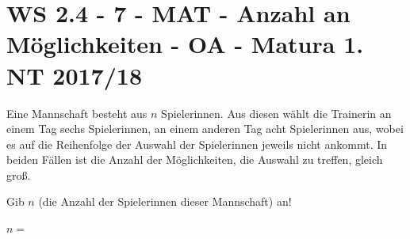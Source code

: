 \section{WS 2.4 - 7 - MAT - Anzahl an Möglichkeiten - OA - Matura 1. NT 2017/18}

\begin{beispiel}[WS 2.4]{1}
Eine Mannschaft besteht aus $n$ Spielerinnen. Aus diesen wählt die Trainerin an einem Tag sechs Spielerinnen, an einem anderen Tag acht Spielerinnen aus, wobei es auf die Reihenfolge der Auswahl der Spielerinnen jeweils nicht ankommt. In beiden Fällen ist die Anzahl der Möglichkeiten, die Auswahl zu treffen, gleich groß.

Gib $n$ (die Anzahl der Spielerinnen dieser Mannschaft) an!\leer

$n=$\,
\end{beispiel}